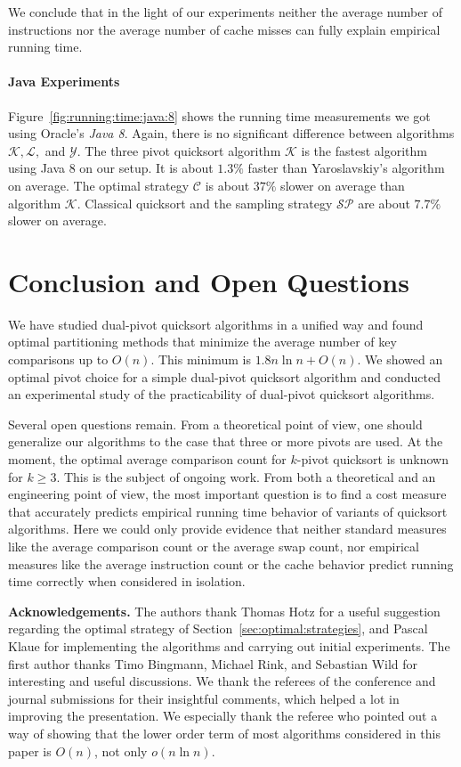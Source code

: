 \documentclass[prodmode,acmtalg]{acmsmall}
\begin{document}
We conclude that in the light of our experiments
neither
the average number of instructions
nor the average number of cache misses can fully explain empirical running time.

\paragraph{Java Experiments} Figure~\ref{fig:running:time:java:8} shows the
running time measurements we got using Oracle's \emph{Java 8}. 
Again, there is no significant difference between algorithms $\mathcal{K}, \mathcal{L},$ and $\mathcal{Y}$.
The three pivot quicksort algorithm $\mathcal{K}$ is the fastest
algorithm using Java 8 on our setup. It is about $1.3\%$ faster than Yaroslavskiy's 
algorithm on average. The optimal strategy $\mathcal{C}$ is about  $37\%$ slower
on average than algorithm $\mathcal{K}$. Classical quicksort and the sampling 
strategy $\mathcal{SP}$ are about $7.7\%$ slower on average. 

\section{Conclusion and Open Questions}\label{sec:conclusion}

We have studied dual-pivot quicksort algorithms in a unified way and found
optimal partitioning methods that minimize the average number of key comparisons
up to $O(n)$. This minimum is $1.8 n \ln
n + O(n)$. We showed an optimal pivot choice for a simple dual-pivot
quicksort algorithm and conducted an experimental study of the 
practicability of dual-pivot quicksort algorithms.

Several open questions remain. From a theoretical point of view, one should
generalize our algorithms to the case that three or more pivots are used. At the
moment, the optimal average comparison count for $k$-pivot quicksort is unknown
for $k \geq 3$. This is the subject of ongoing work. From both a theoretical and
an engineering point of view, the most important question is to find a cost
measure that accurately predicts empirical running time behavior of variants of
quicksort algorithms.  Here we could only provide evidence that neither
standard measures like the average comparison count or the average swap count,
nor empirical measures like the average instruction count or the cache behavior
predict running time correctly when considered in isolation.

\medskip

\noindent\textbf{Acknowledgements.} The authors thank Thomas Hotz for a useful
suggestion regarding the optimal strategy of
Section~\ref{sec:optimal:strategies}, and Pascal Klaue for implementing the
algorithms and carrying out initial experiments. The first author thanks Timo
Bingmann, Michael Rink, and Sebastian Wild for interesting and useful
discussions. We thank the referees of the conference and journal submissions for their
insightful comments, which helped a lot in improving the presentation. We especially
thank the referee who pointed out a way of showing that the lower order term 
of most algorithms considered in this paper is $O(n)$,
not only $o(n \ln n)$. 
\end{document}
